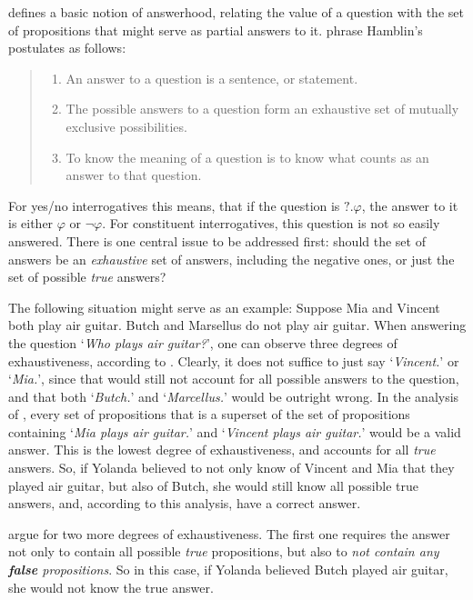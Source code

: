 \documentclass[notitlepage,twoside,a4paper]{scrreprt}
\newcommand{\stress}{\textbf} %
\newcommand{\example}[1]{`\textit{#1}'} %
\newenvironment{quotes}{\begin{quote}\sf}{\rm\end{quote}}
\theoremstyle{remark}
\theoremstyle{remark}
\theoremstyle{definition}
\theoremstyle{definition}
\begin{document}
\cite{hamblin:q} defines a basic notion of answerhood, relating the value of
a question with the set of propositions that might serve as partial answers to
it. \cite{gs:q} phrase Hamblin’s postulates as follows:

\begin{quotes}
  \begin{enumerate}
    \item An answer to a question is a sentence, or statement.
    \item The possible answers to a question form an exhaustive set of mutually
    exclusive possibilities.
    \item To know the meaning of a question is to know what counts as an answer to
    that question.
  \end{enumerate}
\end{quotes}

For yes/no interrogatives this means, that if the question is $?.\varphi$, the
answer to it is either $\varphi$ or $\neg\varphi$. For constituent
interrogatives, this question is not so easily answered.  There is one central
issue to be addressed first: should the set of answers be an \emph{exhaustive}
set of answers, including the negative ones, or just the set of possible
\emph{true} answers?

The following situation might serve as an example: Suppose Mia and Vincent both
play air guitar. Butch and Marsellus do not play air guitar. When answering the
question \example{Who plays air guitar?}, one can observe three degrees of
exhaustiveness, according to \cite[section 1.5]{gs:sawhq}. Clearly, it does not
suffice to just say \example{Vincent.} or \example{Mia.}, since that would still
not account for all possible answers to the question, and that both
\example{Butch.} and \example{Marcellus.} would be outright wrong. In the
analysis of \cite{karttunen:1977}, every set of propositions that is a superset
of the set of propositions containing \example{Mia plays air guitar.} and
\example{Vincent plays air guitar.} would be a valid answer. This is the lowest
degree of exhaustiveness, and accounts for all \emph{true} answers. So, if
Yolanda believed to not only know of Vincent and Mia that they played air
guitar, but also of Butch, she would still know all possible true answers, and,
according to this analysis, have a correct answer.

\cite{gs:sqpa} argue for two more degrees of exhaustiveness. The first
one requires the answer not only to contain all possible \emph{true}
propositions, but also to \emph{not contain any \stress{false} propositions}. So
in this case, if Yolanda believed Butch played air guitar, she would not know
the true answer.
\end{document}

